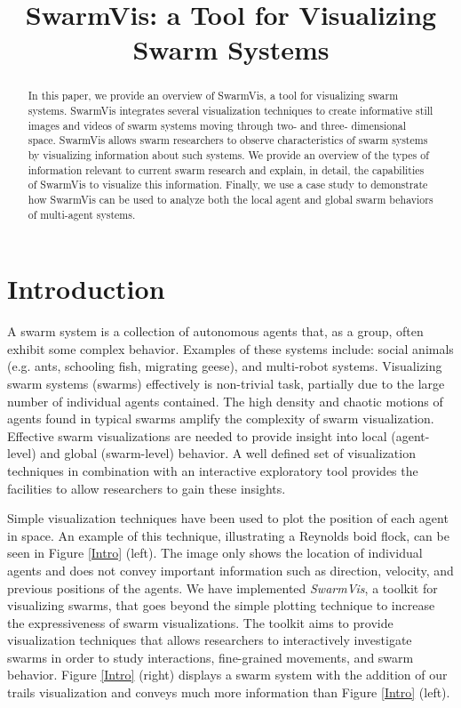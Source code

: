 \documentclass[conference]{IEEEtran}
\begin{document}
\title{SwarmVis: a Tool for Visualizing Swarm Systems}

\author{
\and
{}
}
\maketitle


\begin{abstract}
In this paper, we provide an overview of SwarmVis, a tool for
visualizing swarm systems. SwarmVis integrates several visualization
techniques to create informative still images and videos of swarm
systems moving through two- and three- dimensional space. SwarmVis
allows swarm researchers to observe characteristics of swarm systems by
visualizing information about such systems. We provide an overview of
the types of information relevant to current swarm research and explain,
in detail, the capabilities of SwarmVis to visualize this information.
Finally, we use a case study to
demonstrate how SwarmVis can be used to analyze both the local agent and
global swarm behaviors of multi-agent systems.

\end{abstract}

\section{Introduction}
A swarm system is a collection of autonomous agents that, as a group,
often exhibit some complex behavior.
Examples of these systems include: social animals (e.g. ants\cite{couzin2003sol}, schooling fish\cite{parrish2002sof}, migrating geese\cite{reynolds1987}), 
and multi-robot systems\cite{mondada2004sbn}\cite{mclurkin2004srt}.
Visualizing swarm systems (swarms) effectively is non-trivial task, partially due to the large number of individual agents contained.
The high density and chaotic motions of agents found in typical swarms amplify the complexity of swarm visualization.
Effective swarm visualizations are needed to provide insight into local (agent-level) and global (swarm-level) behavior.
A well defined set of visualization techniques in combination with an interactive exploratory tool provides
the facilities to allow researchers to gain these insights.


Simple visualization techniques have been used to plot the position of each agent in space.
An example of this technique, illustrating a Reynolds boid flock\cite{reynolds1987}, can be seen in Figure \ref{Intro} (left).
The image only shows the location of individual agents and does not convey important
information such as direction, velocity, and previous positions of the agents.
We have implemented \textit{SwarmVis}, a toolkit for visualizing swarms,
that goes beyond the simple plotting technique to increase the
expressiveness of swarm visualizations.
The toolkit aims to provide visualization techniques that allows researchers to interactively
investigate swarms in order to study interactions, fine-grained movements, and swarm behavior.
Figure \ref{Intro} (right) displays a swarm system with the addition of our trails visualization and conveys much more
information than Figure \ref{Intro} (left).
\end{document}
